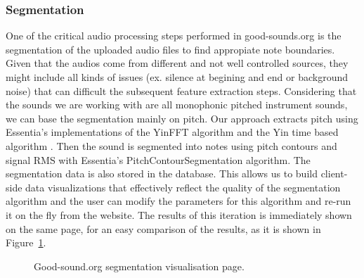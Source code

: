 \documentclass{article}
\begin{document}
\subsubsection{Segmentation}
One of the critical audio processing steps performed in good-sounds.org is the segmentation of the uploaded audio files to find appropiate note boundaries. Given that the audios come from different and not well controlled sources, they might include all kinds of issues (ex. silence at begining and end or background noise) that can difficult the subsequent feature extraction steps. Considering that the sounds we are working with are all monophonic pitched instrument sounds, we can base the segmentation mainly on pitch. Our approach extracts pitch using Essentia’s \cite{03} implementations of the YinFFT algorithm \cite{04} and the Yin time based algorithm \cite{05}. Then the sound is segmented into notes using pitch contours \cite{06} and signal RMS with Essentia’s PitchContourSegmentation algorithm.  
The segmentation data is also stored in the database. This allows us to build client-side data visualizations that effectively reflect the quality of the segmentation algorithm and the user can modify the parameters for this algorithm and re-run it on the fly from the website. The results of this iteration is immediately shown on the same page, for an easy comparison of the results, as it is shown in Figure~\ref{fig:segmentation}.

\begin{figure}[ht]
 \centerline{}
 \caption{Good-sound.org segmentation visualisation page.}
 \label{fig:segmentation}
\end{figure}
\end{document}
